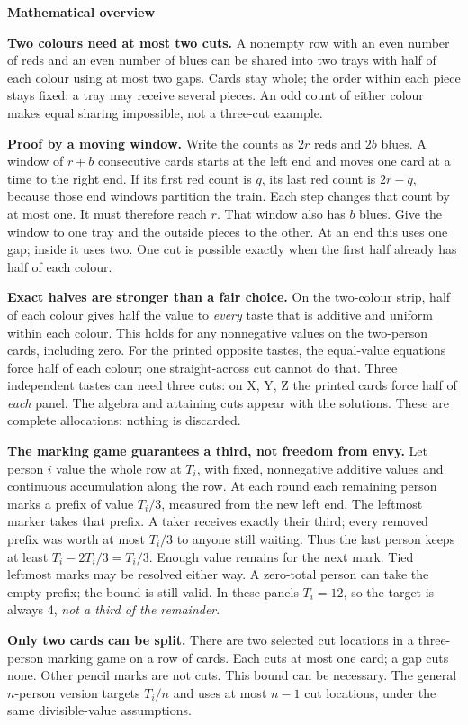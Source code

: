 \documentclass[11pt]{article}
\newcommand{\head}[1]{\par\textbf{\large #1}\par}
\begin{document}
\head{Mathematical overview}
\textbf{Two colours need at most two cuts.} A nonempty row with an even number of reds and an even number of blues can be shared into two trays with half of each colour using at most two gaps. Cards stay whole; the order within each piece stays fixed; a tray may receive several pieces. An odd count of either colour makes equal sharing impossible, not a three-cut example.

\textbf{Proof by a moving window.} Write the counts as $2r$ reds and $2b$ blues. A window of $r+b$ consecutive cards starts at the left end and moves one card at a time to the right end. If its first red count is $q$, its last red count is $2r-q$, because those end windows partition the train. Each step changes that count by at most one. It must therefore reach $r$. That window also has $b$ blues. Give the window to one tray and the outside pieces to the other. At an end this uses one gap; inside it uses two. One cut is possible exactly when the first half already has half of each colour.

\textbf{Exact halves are stronger than a fair choice.} On the two-colour strip, half of each colour gives half the value to \emph{every} taste that is additive and uniform within each colour. This holds for any nonnegative values on the two-person cards, including zero. For the printed opposite tastes, the equal-value equations force half of each colour; one straight-across cut cannot do that. Three independent tastes can need three cuts: on X, Y, Z the printed cards force half of \emph{each} panel. The algebra and attaining cuts appear with the solutions. These are complete allocations: nothing is discarded.

\textbf{The marking game guarantees a third, not freedom from envy.} Let person $i$ value the whole row at $T_i$, with fixed, nonnegative additive values and continuous accumulation along the row. At each round each remaining person marks a prefix of value $T_i/3$, measured from the new left end. The leftmost marker takes that prefix. A taker receives exactly their third; every removed prefix was worth at most $T_i/3$ to anyone still waiting. Thus the last person keeps at least $T_i-2T_i/3=T_i/3$. Enough value remains for the next mark. Tied leftmost marks may be resolved either way. A zero-total person can take the empty prefix; the bound is still valid. In these panels $T_i=12$, so the target is always 4, \emph{not a third of the remainder}.

\textbf{Only two cards can be split.} There are two selected cut locations in a three-person marking game on a row of cards. Each cuts at most one card; a gap cuts none. Other pencil marks are not cuts. This bound can be necessary. The general $n$-person version targets $T_i/n$ and uses at most $n-1$ cut locations, under the same divisible-value assumptions.
\end{document}
